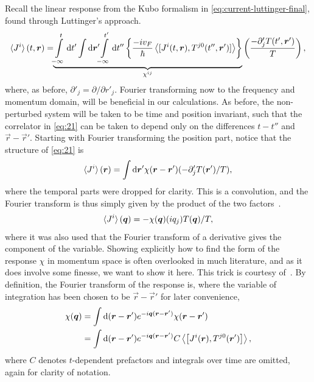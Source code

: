 Recall the linear response from the Kubo formalism in \cref{eq:current-luttinger-final}, found through Luttinger's approach.
\begin{equation}
  \label{eq:21}
  \braket{J^i}(t, \vec{r}) = \!\!
  \underbrace{
    \int\limits_{-\infty }^{t} \mathrm{d}t'
    \int \mathrm{d}\vec{r}' \!\!
  \int\limits_{-\infty }^{t'} \mathrm{d}t''
  \left\{
    \frac{-i v_F}{\hbar }
    \Braket{
      [J^i(t, \vec{r}), T^{j 0} (t'', \vec{r}')]
    }
  \right\}
  }_{\chi^{ij}}
  \left( \frac{- \partial' _{j} T(t', \vec{r}')}{T} \right),
\end{equation}
where, as before, \( \partial'_j = \partial / \partial r'_j \).
Fourier transforming now to the frequency and momentum domain, will be beneficial in our calculations.
As before, the non-perturbed system will be taken to be time and position invariant, such that the correlator in \cref{eq:21} can be taken to depend only on the differences $t-t''$ and $\vec{r} - \vec{r}' $.
Starting with Fourier transforming the position part, notice that the structure of \cref{eq:21} is
\[
  \braket{J^i}(\vec{r}) = \int \mathrm{d} \vec{r}' \chi (\vec{r} - \vec{r}') (-\partial _j' T(\vec{r}') /T),
\]
where the temporal parts were dropped for clarity.
This is a convolution, and the Fourier transform is thus simply given by the product of the two factors~\cite{rottmannMatematiskFormelsamling1995}.
\begin{equation}
  \braket{J^i}(\vec{q}) = -
  \chi (\vec{q}) (iq_j) T(\vec{q}) /T,
\end{equation}
where it was also used that the Fourier transform of a derivative gives the component of the variable.
Showing explicitly how to find the form of the response $\chi $ in momentum space is often overlooked in much literature, and as it does involve some finesse, we want to show it here.
This trick is courtesy of~\textcite{changLectureNotesManybody2018}.
By definition, the Fourier transform of the response is, where the variable of integration has been chosen to be $\vec{r}-\vec{r}'$ for later convenience,
\begin{align}
  \chi (\vec{q}) &= \int \mathrm{d}(\vec{r} - \vec{r}') e^{-i\vec{q}(\vec{r}-\vec{r}')} \chi (\vec{r} - \vec{r}')\\
                 &= \int \mathrm{d}(\vec{r} - \vec{r}') e^{-i\vec{q}(\vec{r}-\vec{r}')} C \Braket{
                   \left[
J^i (\vec{r}), T^{j 0}(\vec{r}')
                   \right]},\\
\end{align}
where $C$ denotes $t$-dependent prefactors and integrals over time are omitted, again for clarity of notation.
